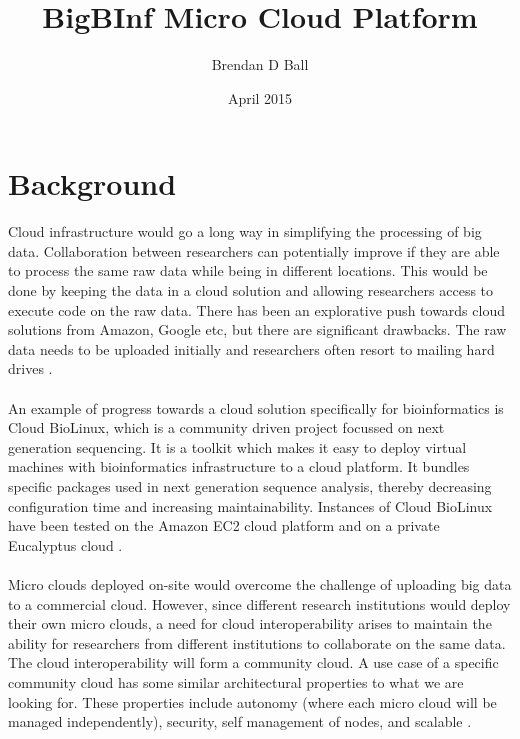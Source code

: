 \documentclass[prodmode,acmtecs]{acmsmall}
\begin{document}

\title{BigBInf Micro Cloud Platform} %
\author{Brendan D Ball
}
\date{April 2015}
\maketitle
\section{Background}
Cloud infrastructure would go a long way in simplifying the processing of big data. Collaboration between researchers can potentially improve if they are able to process the same raw data while being in different locations. This would be done by keeping the data in a cloud solution and allowing researchers access to execute code on the raw data. There has been an explorative push towards cloud solutions from Amazon, Google etc, but there are significant drawbacks. The raw data needs to be uploaded initially and researchers often resort to mailing hard drives \cite{baker2010next}. 
\\
\\
An example of progress towards a cloud solution specifically for bioinformatics is Cloud BioLinux, which is a community driven project focussed on next generation sequencing. It is a toolkit which makes it easy to deploy virtual machines with bioinformatics infrastructure to a cloud platform. It bundles specific packages used in next generation sequence analysis, thereby decreasing configuration time and increasing maintainability. Instances of Cloud BioLinux have been tested on the Amazon EC2 cloud platform and on a private Eucalyptus cloud \cite{krampis2012cloud}.
\\
\\
Micro clouds deployed on-site would overcome the challenge of uploading big data to a commercial cloud. However, since different research institutions would deploy their own micro clouds, a need for cloud interoperability arises to maintain the ability for researchers from different institutions to collaborate on the same data. The cloud interoperability will form a community cloud. A use case of a specific community cloud has some similar architectural properties to what we are looking for. These properties include autonomy (where each micro cloud will be managed independently), security, self management of nodes, and scalable \cite{jimenez2014deploying}.
\end{document}
